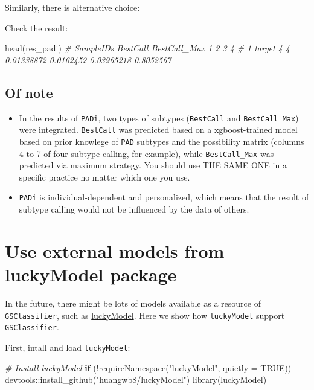 \documentclass[
  12pt,
]{book}
\newenvironment{Shaded}{\begin{snugshade}}{\end{snugshade}}
\newcommand{\AttributeTok}[1]{\textcolor[rgb]{0.77,0.63,0.00}{#1}}
\newcommand{\CommentTok}[1]{\textcolor[rgb]{0.56,0.35,0.01}{\textit{#1}}}
\newcommand{\ConstantTok}[1]{\textcolor[rgb]{0.00,0.00,0.00}{#1}}
\newcommand{\ControlFlowTok}[1]{\textcolor[rgb]{0.13,0.29,0.53}{\textbf{#1}}}
\newcommand{\FunctionTok}[1]{\textcolor[rgb]{0.00,0.00,0.00}{#1}}
\newcommand{\NormalTok}[1]{#1}
\newcommand{\SpecialCharTok}[1]{\textcolor[rgb]{0.00,0.00,0.00}{#1}}
\newcommand{\StringTok}[1]{\textcolor[rgb]{0.31,0.60,0.02}{#1}}
\begin{document}
Similarly, there is alternative choice:

Check the result:

\begin{Shaded}
\begin{Highlighting}[]
\FunctionTok{head}\NormalTok{(res\_padi)}
\CommentTok{\#   SampleIDs BestCall BestCall\_Max          1         2          3         4}
\CommentTok{\# 1    target        4            4 0.01338872 0.0162452 0.03965218 0.8052567}
\end{Highlighting}
\end{Shaded}

\hypertarget{of-note-1}{%
\subsection{Of note}\label{of-note-1}}

\begin{itemize}
\item
  In the results of \texttt{PADi}, two types of subtypes (\texttt{BestCall} and \texttt{BestCall\_Max}) were integrated. \texttt{BestCall} was predicted based on a xgboost-trained model based on prior knowlege of \texttt{PAD} subtypes and the possibility matrix (columns 4 to 7 of four-subtype calling, for example), while \texttt{BestCall\_Max} was predicted via maximum strategy. You should use THE SAME ONE in a specific practice no matter which one you use.
\item
  \texttt{PADi} is individual-dependent and personalized, which means that the result of subtype calling would not be influenced by the data of others.
\end{itemize}

\hypertarget{use-external-models-from-luckymodel-package}{%
\section{Use external models from luckyModel package}\label{use-external-models-from-luckymodel-package}}

In the future, there might be lots of models available as a resource of \texttt{GSClassifier}, such as \href{https://github.com/huangwb8/luckyModel}{luckyModel}. Here we show how \texttt{luckyModel} support \texttt{GSClassifier}.

First, intall and load \texttt{luckyModel}:

\begin{Shaded}
\begin{Highlighting}[]
\CommentTok{\# Install luckyModel}
\ControlFlowTok{if}\NormalTok{ (}\SpecialCharTok{!}\FunctionTok{requireNamespace}\NormalTok{(}\StringTok{"luckyModel"}\NormalTok{, }\AttributeTok{quietly =} \ConstantTok{TRUE}\NormalTok{))}
\NormalTok{    devtools}\SpecialCharTok{::}\FunctionTok{install\_github}\NormalTok{(}\StringTok{"huangwb8/luckyModel"}\NormalTok{)}
\FunctionTok{library}\NormalTok{(luckyModel)}
\end{Highlighting}
\end{Shaded}
\end{document}
